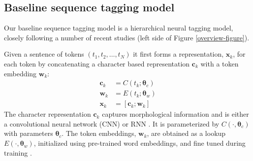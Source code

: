 \documentclass[11pt,a4paper]{article}
\begin{document}



\subsection{Baseline sequence tagging model}
\label{sec:baseline}
Our baseline sequence tagging model is a hierarchical neural tagging model, closely following a number of recent
studies \citep{Ma2016EndtoendSL,lample-EtAl:2016:N16-1,yang-transfer-iclr07,chiu-nichols-2016} (left side of Figure \ref{overview-figure}).

Given a sentence of tokens $(t_1, t_2, \ldots, t_N)$ it first forms a representation, $\mathbf{x}_k$, for each token
by concatenating a character based representation $\mathbf{c}_k$ with a token
embedding $\mathbf{w}_k$:
\begin{align}
\mathbf{c}_k & =  C(t_k; \mathbf{\theta}_c) \nonumber \\
\mathbf{w}_k & =  E(t_k; \mathbf{\theta}_w) \nonumber \\
\mathbf{x}_k & =  [\mathbf{c}_k; \mathbf{w}_k] \label{eqn:token_rep}
\end{align}
The character representation $\mathbf{c}_k$ captures morphological information and
is either a convolutional neural network (CNN) \citep{Ma2016EndtoendSL,chiu-nichols-2016} or RNN \citep{yang-transfer-iclr07,lample-EtAl:2016:N16-1}.  It is parameterized by $C(\cdot, \mathbf{\theta}_c)$ with parameters
$\mathbf{\theta}_c$. The token embeddings, $\mathbf{w}_k$, are obtained as a lookup
$E(\cdot, \mathbf{\theta}_w)$, initialized using pre-trained
word embeddings, and fine tuned during training \citep{NLPfromScratch:Collobert2011}.
\end{document}
